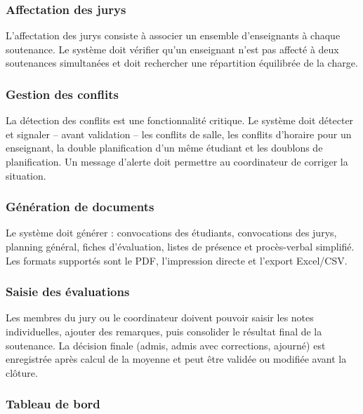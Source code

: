 \documentclass[12pt,a4paper]{article}
\begin{document}
\subsubsection{Affectation des jurys}
\label{subsubsec:affectation_jurys}

L'affectation des jurys consiste à associer un ensemble d'enseignants à chaque
soutenance. Le système doit vérifier qu'un enseignant n'est pas affecté à deux
soutenances simultanées et doit rechercher une répartition équilibrée de la
charge.

\subsubsection{Gestion des conflits}
\label{subsubsec:gestion_conflits}

La détection des conflits est une fonctionnalité critique. Le système doit
détecter et signaler -- avant validation -- les conflits de salle, les conflits
d'horaire pour un enseignant, la double planification d'un même étudiant et les
doublons de planification. Un message d'alerte doit permettre au coordinateur de
corriger la situation.

\subsubsection{Génération de documents}
\label{subsubsec:generation_documents}

Le système doit générer : convocations des étudiants, convocations des jurys,
planning général, fiches d'évaluation, listes de présence et procès-verbal
simplifié. Les formats supportés sont le PDF, l'impression directe et l'export
Excel/CSV.

\subsubsection{Saisie des évaluations}
\label{subsubsec:saisie_evaluations}

Les membres du jury ou le coordinateur doivent pouvoir saisir les notes
individuelles, ajouter des remarques, puis consolider le résultat final de la
soutenance. La décision finale (admis, admis avec corrections, ajourné) est
enregistrée après calcul de la moyenne et peut être validée ou modifiée avant la
clôture.

\subsubsection{Tableau de bord}
\label{subsubsec:tableau_de_bord}
\end{document}
